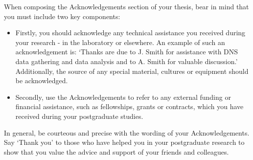 

\begin{acknowledgements}      %


When composing the Acknowledgements section of your thesis, bear in mind that you must include two key components:

\begin{itemize}
	\item Firstly, you should acknowledge any technical assistance you received during your research - in the laboratory or elsewhere. An example of such an acknowledgement is: ‘Thanks are due to J. Smith for assistance with DNS data gathering and data analysis and to A. Smith for valuable discussion.’ Additionally, the source of any special material, cultures or equipment should be acknowledged.
	
	\item Secondly, use the Acknowledgements to refer to any external funding or financial assistance, such as fellowships, grants or contracts, which you have received during your postgraduate studies.
\end{itemize}

In general, be courteous and precise with the wording of your Acknowledgements. Say ‘Thank you’ to those who have helped you in your postgraduate research to show that you value the advice and support of your friends and colleagues.
\end{acknowledgements}


